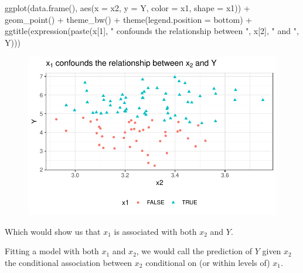 \documentclass[
  letterpaper,
  DIV=11,
  numbers=noendperiod]{scrreport}
\newenvironment{Shaded}{\begin{snugshade}}{\end{snugshade}}
\newcommand{\AttributeTok}[1]{\textcolor[rgb]{0.40,0.45,0.13}{#1}}
\newcommand{\DecValTok}[1]{\textcolor[rgb]{0.68,0.00,0.00}{#1}}
\newcommand{\FunctionTok}[1]{\textcolor[rgb]{0.28,0.35,0.67}{#1}}
\newcommand{\NormalTok}[1]{\textcolor[rgb]{0.00,0.23,0.31}{#1}}
\newcommand{\SpecialCharTok}[1]{\textcolor[rgb]{0.37,0.37,0.37}{#1}}
\newcommand{\StringTok}[1]{\textcolor[rgb]{0.13,0.47,0.30}{#1}}
\begin{document}
\begin{Shaded}
\begin{Highlighting}[]
\FunctionTok{ggplot}\NormalTok{(}\FunctionTok{data.frame}\NormalTok{(), }\FunctionTok{aes}\NormalTok{(}\AttributeTok{x =}\NormalTok{ x2, }\AttributeTok{y =}\NormalTok{ Y, }\AttributeTok{color =}\NormalTok{ x1, }\AttributeTok{shape =}\NormalTok{ x1)) }\SpecialCharTok{+} 
  \FunctionTok{geom\_point}\NormalTok{() }\SpecialCharTok{+} 
  \FunctionTok{theme\_bw}\NormalTok{() }\SpecialCharTok{+} 
  \FunctionTok{theme}\NormalTok{(}\AttributeTok{legend.position =} \StringTok{\textquotesingle{}bottom\textquotesingle{}}\NormalTok{) }\SpecialCharTok{+} 
  \FunctionTok{ggtitle}\NormalTok{(}\FunctionTok{expression}\NormalTok{(}\FunctionTok{paste}\NormalTok{(x[}\DecValTok{1}\NormalTok{], }\StringTok{" confounds the relationship between "}\NormalTok{,}
\NormalTok{                           x[}\DecValTok{2}\NormalTok{], }\StringTok{" and "}\NormalTok{, Y)))}
\end{Highlighting}
\end{Shaded}

\begin{figure}[H]

{\centering \includegraphics{week2/week2_files/figure-pdf/unnamed-chunk-2-1.pdf}

}

\end{figure}

Which would show us that \(x_1\) is associated with both \(x_2\) and
\(Y\).

Fitting a model with both \(x_1\) and \(x_2\), we would call the
prediction of \(Y\) given \(x_2\) the conditional association between
\(x_2\) conditional on (or within levels of) \(x_1\).
\end{document}
